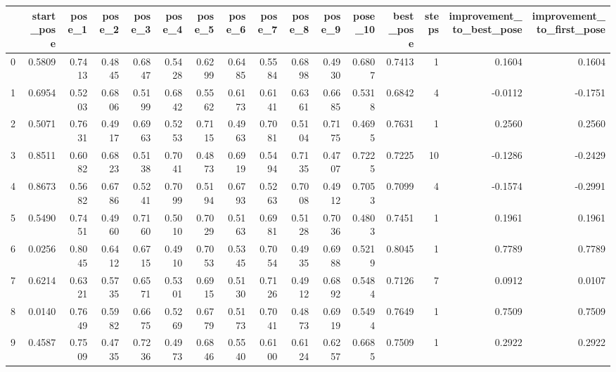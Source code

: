 \begin{tabular}{lrrrrrrrrrrrrrrr}
\toprule
{} &  start\_pose &  pose\_1 &  pose\_2 &  pose\_3 &  pose\_4 &  pose\_5 &  pose\_6 &  pose\_7 &  pose\_8 &  pose\_9 &  pose\_10 &  best\_pose &  steps &  improvement\_to\_best\_pose &  improvement\_to\_first\_pose \\
\midrule
0 &      0.5809 &  0.7413 &  0.4845 &  0.6847 &  0.5428 &  0.6299 &  0.6485 &  0.5584 &  0.6898 &  0.4930 &   0.6807 &     0.7413 &      1 &                    0.1604 &                     0.1604 \\
1 &      0.6954 &  0.5203 &  0.6806 &  0.5199 &  0.6842 &  0.5562 &  0.6173 &  0.6141 &  0.6361 &  0.6685 &   0.5318 &     0.6842 &      4 &                   -0.0112 &                    -0.1751 \\
2 &      0.5071 &  0.7631 &  0.4917 &  0.6963 &  0.5253 &  0.7115 &  0.4963 &  0.7081 &  0.5104 &  0.7175 &   0.4695 &     0.7631 &      1 &                    0.2560 &                     0.2560 \\
3 &      0.8511 &  0.6082 &  0.6823 &  0.5138 &  0.7041 &  0.4873 &  0.6919 &  0.5494 &  0.7135 &  0.4707 &   0.7225 &     0.7225 &     10 &                   -0.1286 &                    -0.2429 \\
4 &      0.8673 &  0.5682 &  0.6786 &  0.5241 &  0.7099 &  0.5194 &  0.6793 &  0.5263 &  0.7008 &  0.4912 &   0.7053 &     0.7099 &      4 &                   -0.1574 &                    -0.2991 \\
5 &      0.5490 &  0.7451 &  0.4960 &  0.7160 &  0.5010 &  0.7029 &  0.5163 &  0.6981 &  0.5128 &  0.7036 &   0.4803 &     0.7451 &      1 &                    0.1961 &                     0.1961 \\
6 &      0.0256 &  0.8045 &  0.6412 &  0.6715 &  0.4910 &  0.7053 &  0.5345 &  0.7054 &  0.4935 &  0.6988 &   0.5219 &     0.8045 &      1 &                    0.7789 &                     0.7789 \\
7 &      0.6214 &  0.6321 &  0.5735 &  0.6571 &  0.5301 &  0.6915 &  0.5130 &  0.7126 &  0.4912 &  0.6892 &   0.5484 &     0.7126 &      7 &                    0.0912 &                     0.0107 \\
8 &      0.0140 &  0.7649 &  0.5982 &  0.6675 &  0.5269 &  0.6779 &  0.5173 &  0.7041 &  0.4873 &  0.6919 &   0.5494 &     0.7649 &      1 &                    0.7509 &                     0.7509 \\
9 &      0.4587 &  0.7509 &  0.4735 &  0.7236 &  0.4973 &  0.6846 &  0.5540 &  0.6100 &  0.6124 &  0.6257 &   0.6685 &     0.7509 &      1 &                    0.2922 &                     0.2922 \\
\bottomrule
\end{tabular}
